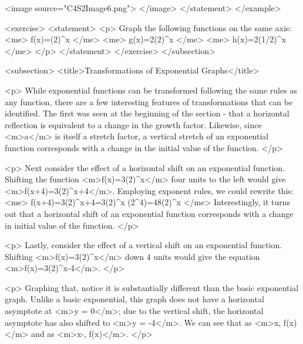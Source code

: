                 <image source="C4S2Image6.png">
                </image>
            </statement>
        </example>

        <exercise>
            <statement>
                <p>
                    Graph the following functions on the same axis:
                    <me>
                        f(x)=(2)^{x}
                    </me>
                    <me>
                        g(x)=2(2)^{x}
                    </me>
                    <me>
                        h(x)=2(1/2)^{x}
                    </me>
                </p>
            </statement>
        </exercise>
    </subsection>


    <subsection>
        <title>Transformations of Exponential Graphs</title>

        <p>
            While exponential functions can be transformed following the same rules as any function, there are a few interesting features of transformations that can be identified.
            The first was seen at the beginning of the section - that a horizontal reflection is equivalent to a change in the growth factor.
            Likewise, since <m>a</m> is itself a stretch factor, a vertical stretch of an exponential function corresponds with a change in the initial value of the function.
        </p>

        <p>
            Next consider the effect of a horizontal shift on an exponential function.
            Shifting the function <m>f(x)=3(2)^{x}</m> four units to the left would give <m>f(x+4)=3(2)^{x+4}</m>.
            Employing exponent rules, we could rewrite this:
            <me>
                f(x+4)=3(2)^{x+4}=3(2)^{x} (2^{4})=48(2)^{x}
            </me>
            Interestingly, it turns out that a horizontal shift of an exponential function corresponds with a change in initial value of the function.
        </p>

        <p>
            Lastly, consider the effect of a vertical shift on an exponential function.
            Shifting <m>f(x)=3(2)^{x}</m> down 4 units would give the equation <m>f(x)=3(2)^{x}-4</m>.
        </p>

        <p>
            Graphing that, notice it is substantially different than the basic exponential graph.
            Unlike a basic exponential, this graph does not have a horizontal asymptote at <m>y = 0</m>; due to the vertical shift, the horizontal asymptote has also shifted to <m>y = -4</m>.
            We can see that as <m>x\to\infty, f(x)\to\infty</m> and as <m>x\to-\infty, f(x)</m>.
        </p>

